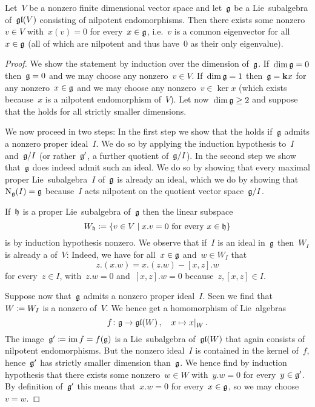 \begin{proposition}
  \label{common eigenvector for nilpotent Lie algebras}
  Let~$V$ be a nonzero finite dimensional vector space and let~$\glie$ be a Lie~subalgebra of~$\mathfrak{gl}(V)$ consisting of nilpotent endomorphisms.
  Then there exists some nonzero~$v \in V$ with~$x(v) = 0$ for every~$x \in \mathfrak{g}$, i.e.~$v$ is a common eigenvector for all~$x \in \mathfrak{g}$ (all of which are nilpotent and thus have~$0$ as their only eigenvalue).
\end{proposition}


\begin{proof}
  We show the statement by induction over the dimension of~$\glie$.
  If~$\dim \mathfrak{g} = 0$ then~$\mathfrak{g} = 0$ and we may choose any nonzero~$v \in V$.
  If~$\dim \mathfrak{g} = 1$ then~$\mathfrak{g} = \mathbf{k} x$ for any nonzero~$x \in \mathfrak{g}$ and we may choose any nonzero~$v \in \ker x$ (which exists because~$x$ is a nilpotent endomorphism of~$V$).
  Let now~$\dim \mathfrak{g} \geq 2$ and suppose that the  holds for all strictly smaller dimensions.
  
  We now proceed in two steps:
  In the first step we show that the  holds if~$\glie$ admits a nonzero proper ideal~$I$.
  We do so by applying the induction hypothesis to~$I$ and~$\mathfrak{g}/I$ (or rather~$\mathfrak{g}'$, a further quotient of~$\mathfrak{g}/I$).
  In the second step we show that~$\glie$ does indeed admit such an ideal.
  We do so by showing that every maximal proper Lie~subalgebra~$I$ of~$\glie$ is already an ideal, which we do by showing that~$\operatorname{N}_{\mathfrak{g}}(I) = \mathfrak{g}$ because~$I$ acts nilpotent on the quotient vector space~$\mathfrak{g}/I$.
  
  If~$\mathfrak{h}$ is a proper Lie~subalgebra of~$\glie$ then the linear subspace
  \[
    W_{\hlie}
    \defined
    \{
      v \in V
    \suchthat
      \text{$x.v = 0$ for every~$x \in \hlie$}
    \}
  \]
  is by induction hypothesis nonzero.
  We observe that if~$I$ is an ideal in~$\glie$ then~$W_I$ is already a {\subrepresentation{$\glie$}} of~$V$:
  Indeed, we have for all~$x \in \mathfrak{g}$ and~$w \in W_I$ that
  \[
    z.(x.w)
    =
    x.(z.w) - [x,z].w
  \]
  for every~$z \in I$, with~$z.w = 0$ and~$[x,z].w = 0$ because~$z, [x,z] \in I$.
  
  Suppose now that~$\glie$ admits a nonzero proper ideal~$I$.
  Seen we find that~$W \coloneqq W_I$ is a nonzero {\subrepresentation{$\glie$}} of~$V$.
  We hence get a homomorphism of Lie~algebras
  \[
    f
    \colon
    \glie
    \to
    \gllie(W) \,,
    \quad
    x
    \mapsto
    \restrict{x}{W} \,.
  \]
  The image~$\mathfrak{g}' \coloneqq \operatorname{im} f = f(\mathfrak{g})$ is a Lie~subalgebra of~$\mathfrak{gl}(W)$ that again consists of nilpotent endomorphisms.
  But the nonzero ideal~$I$ is contained in the kernel of~$f$, hence~$\mathfrak{g}'$ has strictly smaller dimension than~$\glie$.
  We hence find by induction hypothesis that there exists some nonzero~$w \in W$ with~$y.w = 0$ for every~$y \in \mathfrak{g}'$.
  By definition of~$\mathfrak{g}'$ this means that~$x.w = 0$ for every~$x \in \mathfrak{g}$, so we may choose~$v = w$.
  

\end{proof}
